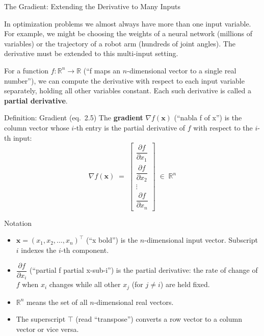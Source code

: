 \documentclass[aspectratio=169,10pt]{beamer}
\newcommand{\x}{\mathbf{x}}
\begin{document}
\begin{frame}[allowframebreaks]{The Gradient: Extending the Derivative to Many Inputs}

  In optimization problems we almost always have more than one input
  variable.  For example, we might be choosing the weights of a neural
  network (millions of variables) or the trajectory of a robot arm
  (hundreds of joint angles).  The derivative must be extended to this
  multi-input setting.

  \medskip
  For a function $f:\mathbb{R}^n \to \mathbb{R}$ (``f maps an
  $n$-dimensional vector to a single real number''), we can compute the
  derivative with respect to each input variable separately, holding all
  other variables constant.  Each such derivative is called a
  \textbf{partial derivative}.

  \begin{block}{Definition: Gradient (eq.\ 2.5)}
    The \textbf{gradient} $\nabla f(\x)$ (``nabla f of x'') is the column
    vector whose $i$-th entry is the partial derivative of $f$ with respect
    to the $i$-th input:
    \[
      \nabla f(\x)
      \;=\;
      \begin{bmatrix}
        \dfrac{\partial f}{\partial x_1} \\[8pt]
        \dfrac{\partial f}{\partial x_2} \\[4pt]
        \vdots \\[4pt]
        \dfrac{\partial f}{\partial x_n}
      \end{bmatrix}
      \;\in\; \mathbb{R}^n
    \]
  \end{block}

  \begin{block}{Notation}
    \begin{itemize}
      \item $\x = (x_1, x_2, \ldots, x_n)^\top$ (``x bold'') is the
            $n$-dimensional input vector.  Subscript $i$ indexes the
            $i$-th component.
      \item $\dfrac{\partial f}{\partial x_i}$ (``partial f partial x-sub-i'')
            is the partial derivative: the rate of change of $f$ when
            $x_i$ changes while all other $x_j$ (for $j\neq i$) are
            held fixed.
      \item $\mathbb{R}^n$ means the set of all $n$-dimensional real vectors.
      \item The superscript $\top$ (read ``transpose'') converts a row
            vector to a column vector or vice versa.
    \end{itemize}
  \end{block}


\end{frame}
\end{document}
